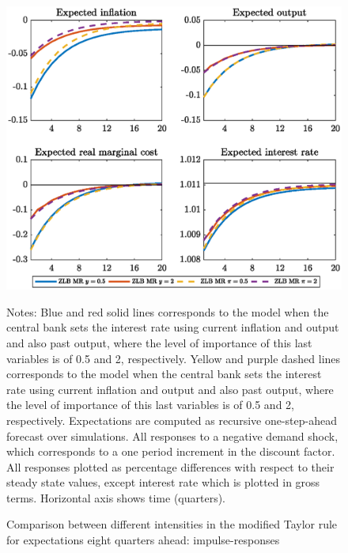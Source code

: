 \documentclass[11pt]{article}
\numberwithin{equation}{section}
\begin{document}
\begin{figure}[H]
	\centering
	\caption{Comparison between different intensities in the modified Taylor rule for expectations eight quarters ahead: impulse-responses}\label{fig:irfCompDegreeExp8_pref}
	\includegraphics[scale=.6]{irfCompDegreeExp8_pref}
	\begin{minipage}{\linewidth}
    	\vspace{1mm}
	\footnotesize{{\sc Notes:} Blue and red solid lines corresponds to the model when the central bank sets the interest rate using current inflation and output and also past output, where the level of importance of this last variables is of 0.5 and 2, respectively. Yellow and purple dashed lines corresponds to the model when the central bank sets the interest rate using current inflation and output and also past output, where the level of importance of this last variables is of 0.5 and 2, respectively. Expectations are computed as recursive one-step-ahead forecast over simulations. All responses to a negative demand shock, which corresponds to a one period increment in the discount factor. All responses plotted as percentage differences with respect to their steady state values, except interest rate which is plotted in gross terms. Horizontal axis shows time (quarters).}
	\end{minipage}
\end{figure}
\end{document}
